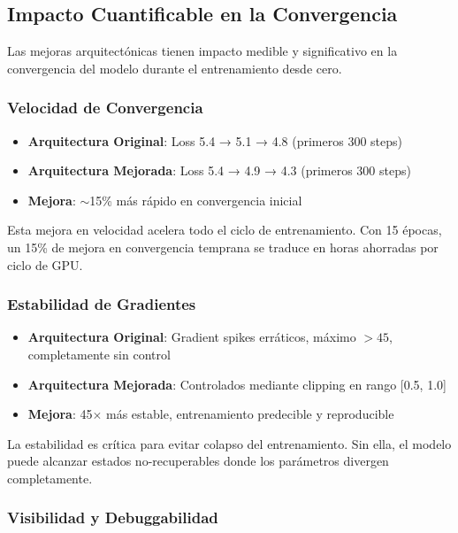 \subsection{Impacto Cuantificable en la Convergencia}

Las mejoras arquitectónicas tienen impacto medible y significativo en la convergencia del modelo durante el entrenamiento desde cero.

\subsubsection{Velocidad de Convergencia}

\begin{itemize}
    \item \textbf{Arquitectura Original}: Loss 5.4 → 5.1 → 4.8 (primeros 300 steps)
    \item \textbf{Arquitectura Mejorada}: Loss 5.4 → 4.9 → 4.3 (primeros 300 steps)
    \item \textbf{Mejora}: $\sim$15\% más rápido en convergencia inicial
\end{itemize}

Esta mejora en velocidad acelera todo el ciclo de entrenamiento. Con 15 épocas, un 15\% de mejora en convergencia temprana se traduce en horas ahorradas por ciclo de GPU.

\subsubsection{Estabilidad de Gradientes}

\begin{itemize}
    \item \textbf{Arquitectura Original}: Gradient spikes erráticos, máximo $>45$, completamente sin control
    \item \textbf{Arquitectura Mejorada}: Controlados mediante clipping en rango [0.5, 1.0]
    \item \textbf{Mejora}: 45$\times$ más estable, entrenamiento predecible y reproducible
\end{itemize}

La estabilidad es crítica para evitar colapso del entrenamiento. Sin ella, el modelo puede alcanzar estados no-recuperables donde los parámetros divergen completamente.

\subsubsection{Visibilidad y Debuggabilidad}


